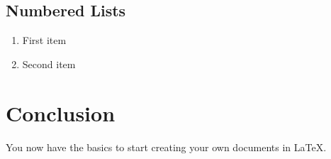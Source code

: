 \documentclass[12pt]{article}
\begin{document}
\subsection{Numbered Lists}
\begin{enumerate}
    \item First item
    \item Second item
\end{enumerate}

\section{Conclusion}
You now have the basics to start creating your own documents in LaTeX.
\end{document}

